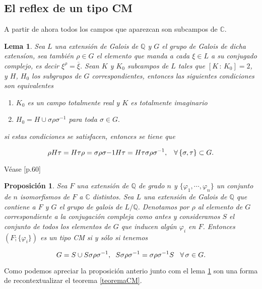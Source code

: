 \documentclass[letterpaper]{report}
\newtheorem{prop}[teorema]{Proposici\'on}
\newtheorem{lema}[teorema]{Lema}
\newcommand{\rac}{\ensuremath{ \mathbb Q }}
\newcommand{\co}{\ensuremath{\mathbb C }}
\begin{document}
\subsection*{El reflex de un tipo CM}
\noindent A partir de ahora todos los campos que aparezcan son subcampos de $\co$.
\begin{lema}\label{lemaCM}
Sea $L$ una extensión de Galois de $\rac$ y $G$ el grupo de Galois de dicha extensíon, sea también $\rho\in G$ el elemento que manda a cada $\xi\in L$ a su conjugado complejo, es decir $\xi^{\rho}=\overline{\xi}$. Sean $K$ y $K_0$ subcampos de $L$ tales que $[K\,:\,K_0]=2$, y $H$, $H_0$ los subgrupos de $G$ correspondientes, entonces las siguientes condiciones son equivalentes
\begin{enumerate}
	\item[i)] $K_0$ es un campo totalmente real y $K$ es totalmente imaginario
	\item[ii)] $H_0=H\cup\sigma\rho\sigma^{-1}$ para toda $\sigma\in G.$
\end{enumerate}
\noindent si estas condiciones se satisfacen, entonces se tiene que 

$$
\rho H\tau=H\tau\rho=\sigma\rho\sigma{-1}H\tau=H\tau\sigma\rho\sigma^{-1}
,\hspace{0.3cm}\forall\,\lbrace\sigma,\tau\rbrace\subset G.
$$
\end{lema} 
Véase \cite{shimura}[p.60]
\begin{prop}
Sea $F$ una extensión de $\rac$ de grado $n$ y  \hbox{$\lbrace\varphi_1,\cdots,\varphi_{n}\rbrace$} un conjunto de $n$ isomorfismos de $F$ a $\co$ distintos. Sea $L$ una extensión de Galois de $\rac$ que contiene a $F$ y $G$ el grupo de galois de $L/\rac$. Denotamos por $\rho$ al elemento de $G$ correspondiente a la conjugación compleja como antes y consideramos $S$ el conjunto de todos los elementos de $G$ que inducen algún $\varphi_i$ en $F$. Entonces $(F;\lbrace\varphi_i\rbrace)$ es un tipo CM si y sólo si tenemos 

$$G=S\cup S\sigma\rho\sigma^{-1},\hspace{0.2cm}S\sigma\rho\sigma^{-1}=\sigma\rho\sigma^{-1}S\hspace{0.3cm}\forall\,\sigma\in G.$$
\end{prop}
\noindent Como podemos apreciar la proposición anterio junto com el lema \ref{lemaCM} son una forma de recontextualizar el teorema \ref{teoremaCM}.
\end{document}
